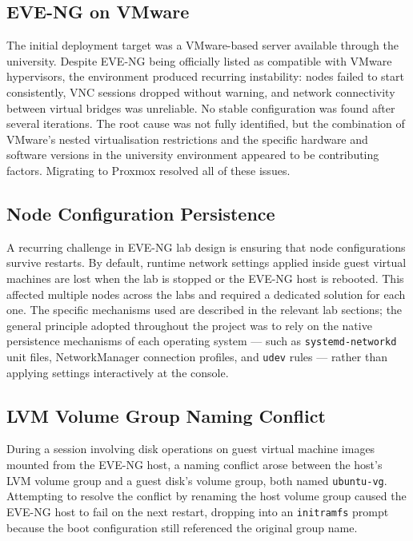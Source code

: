 \subsection{EVE-NG on VMware}

The initial deployment target was a VMware-based server available through the
university. Despite EVE-NG being officially listed as compatible with VMware~\cite{vmware_esxi}
hypervisors, the environment produced recurring instability: nodes failed to start
consistently, VNC sessions dropped without warning, and network connectivity between
virtual bridges was unreliable. No stable configuration was found after several
iterations. The root cause was not fully identified, but the combination of
VMware's nested virtualisation restrictions and the specific hardware and software
versions in the university environment appeared to be contributing factors.
Migrating to Proxmox resolved all of these issues.

\subsection{Node Configuration Persistence}

A recurring challenge in EVE-NG lab design is ensuring that node configurations
survive restarts. By default, runtime network settings applied inside guest virtual
machines are lost when the lab is stopped or the EVE-NG host is rebooted. This
affected multiple nodes across the labs and required a dedicated solution for each
one. The specific mechanisms used are described in the relevant lab sections; the
general principle adopted throughout the project was to rely on the native
persistence mechanisms of each operating system --- such as \texttt{systemd-networkd}
unit files, NetworkManager connection profiles, and \texttt{udev} rules --- rather
than applying settings interactively at the console.

\subsection{LVM Volume Group Naming Conflict}

During a session involving disk operations on guest virtual machine images mounted
from the EVE-NG host, a naming conflict arose between the host's LVM volume group
and a guest disk's volume group, both named \texttt{ubuntu-vg}. Attempting to
resolve the conflict by renaming the host volume group caused the EVE-NG host to
fail on the next restart, dropping into an \texttt{initramfs} prompt because the
boot configuration still referenced the original group name.

